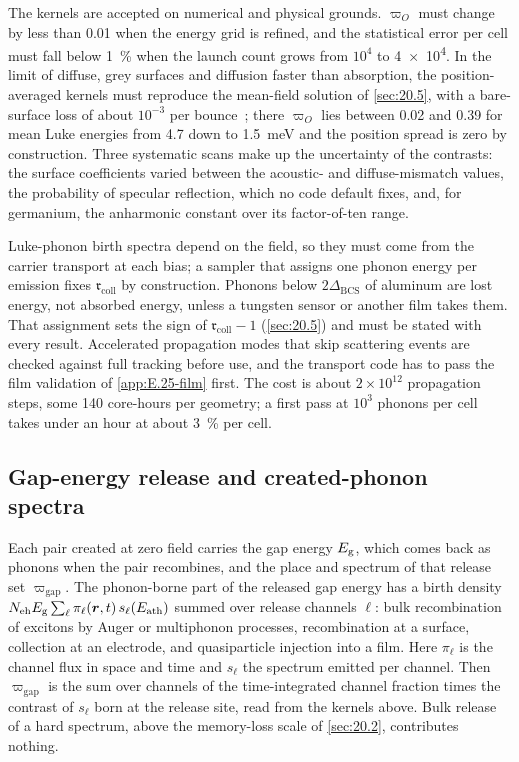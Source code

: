 The kernels are accepted on numerical and physical grounds. $\varpi_O$ must change by less than 0.01 when the energy grid is refined, and the statistical error per cell must fall below \SI{1}{\percent} when the launch count grows from $10^4$ to \num{4e4}. In the limit of diffuse, grey surfaces and diffusion faster than absorption, the position-averaged kernels must reproduce the mean-field solution of \cref{sec:20.5}, with a bare-surface loss of about $10^{-3}$ per bounce~\cite[Sect.~III\,G]{leman2012invited}; there $\varpi_O$ lies between 0.02 and 0.39 for mean Luke energies from 4.7 down to \SI{1.5}{meV} and the position spread is zero by construction. Three systematic scans make up the uncertainty of the contrasts: the surface coefficients varied between the acoustic- and diffuse-mismatch values, the probability of specular reflection, which no code default fixes, and, for germanium, the anharmonic constant over its factor-of-ten range.

Luke-phonon birth spectra depend on the field, so they must come from the carrier transport at each bias; a sampler that assigns one phonon energy per emission fixes $\mathfrak{r}_{\mathrm{coll}}$ by construction. Phonons below $2\Delta_{\mathrm{BCS}}$ of aluminum are lost energy, not absorbed energy, unless a tungsten sensor or another film takes them. That assignment sets the sign of $\mathfrak{r}_{\mathrm{coll}} - 1$ (\cref{sec:20.5}) and must be stated with every result. Accelerated propagation modes that skip scattering events are checked against full tracking before use, and the transport code has to pass the film validation of \cref{app:E.25-film} first. The cost is about $2\times10^{12}$ propagation steps, some 140 core-hours per geometry; a first pass at $10^3$ phonons per cell takes under an hour at about \SI{3}{\percent} per cell.

\subsection{Gap-energy release and created-phonon spectra}

Each pair created at zero field carries the gap energy $E_{\mathrm{g}}$, which comes back as phonons when the pair recombines, and the place and spectrum of that release set $\varpi_{\mathrm{gap}}$. The phonon-borne part of the released gap energy has a birth density $N_{\mathrm{eh}}E_{\mathrm{g}}\sum_\ell\pi_\ell(\bm{r},t)\,s_\ell(E_{\mathrm{ath}})$ summed over release channels $\ell$: bulk recombination of excitons by Auger or multiphonon processes, recombination at a surface, collection at an electrode, and quasiparticle injection into a film. Here $\pi_\ell$ is the channel flux in space and time and $s_\ell$ the spectrum emitted per channel. Then $\varpi_{\mathrm{gap}}$ is the sum over channels of the time-integrated channel fraction times the contrast of $s_\ell$ born at the release site, read from the kernels above. Bulk release of a hard spectrum, above the memory-loss scale of \cref{sec:20.2}, contributes nothing.

